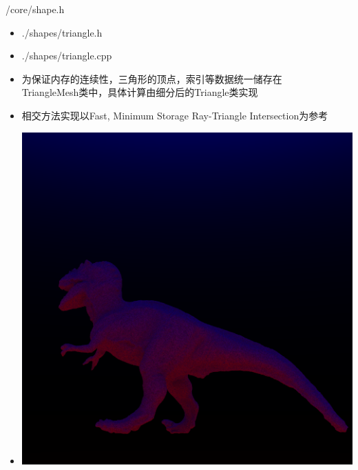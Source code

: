 \documentclass{beamer}
\begin{document}
\begin{frame} {/core/shape.h}
\begin{itemize} [<+->]
\item ./shapes/triangle.h
\item ./shapes/triangle.cpp
\item 为保证内存的连续性，三角形的顶点，索引等数据统一储存在 \\ TriangleMesh类中，具体计算由细分后的Triangle类实现
\item 相交方法实现以Fast, Minimum Storage Ray-Triangle Intersection为参考
\item \includegraphics[scale=0.25]{tyra}
\end{itemize}
\end{frame}
\end{document}
